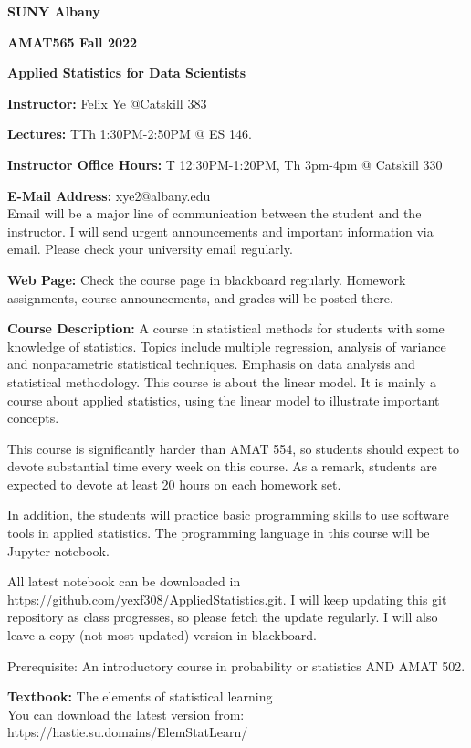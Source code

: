 \documentclass[a4paper,10pt]{article}
\begin{document}
\begin{center}

\textbf{SUNY Albany}

\textbf{AMAT565 Fall 2022}

\textbf{Applied Statistics for Data Scientists}


\end{center}

\textbf{Instructor:} Felix Ye @Catskill 383 

\textbf{Lectures:} TTh 1:30PM-2:50PM  @ ES 146.

\textbf{Instructor Office Hours:}  T 12:30PM-1:20PM, Th 3pm-4pm @ Catskill 330


\textbf{E-Mail Address:} xye2@albany.edu\\
Email will be a major line of communication between the student and the instructor. I will send urgent announcements and important information via email. Please check your university email regularly.

\textbf{Web Page:}
Check the course page in blackboard regularly. Homework assignments, course announcements, and grades will be posted there.


\textbf{Course Description:} 	
A course in statistical methods for students with some knowledge of statistics. Topics include multiple regression, analysis of variance and nonparametric statistical techniques. Emphasis on data analysis and statistical methodology.  
This course is about the linear model. It is mainly a course about applied statistics, using the linear model to illustrate important concepts.

This course is significantly harder than AMAT 554, so students should expect to devote substantial time every week on this course. As a remark, students are expected to devote at least 20 hours on each homework set. 

In addition, the students will practice basic programming skills to use software tools in applied statistics. The programming language in this course will be Jupyter notebook. 

All latest notebook can be downloaded in https://github.com/yexf308/AppliedStatistics.git. I will keep updating this git repository as class progresses, so please fetch the update regularly. I will also leave a copy (not most updated) version in blackboard. 

 Prerequisite: An introductory course in probability or statistics AND AMAT 502.
 

\textbf{Textbook:} 
The elements of statistical learning \\
You can download the latest version from: https://hastie.su.domains/ElemStatLearn/
\end{document}
